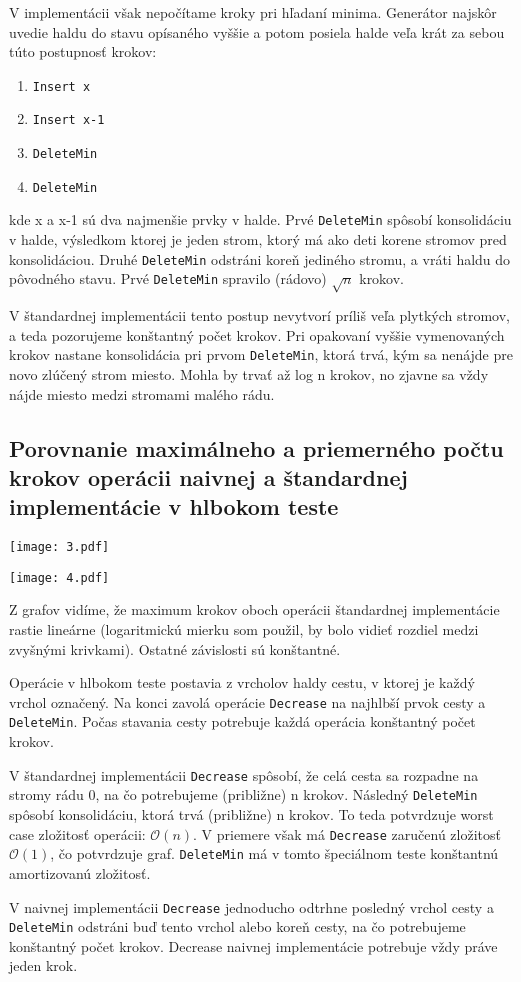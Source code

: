 \documentclass[12pt,a4paper]{article}
\begin{document}
V implementácii však nepočítame kroky pri hľadaní minima. Generátor najskôr uvedie haldu do stavu opísaného vyššie a potom posiela halde veľa krát za sebou túto postupnosť krokov:
\begin{enumerate}
	\item \texttt{Insert x}
	\item \texttt{Insert x-1}
	\item \texttt{DeleteMin}
	\item \texttt{DeleteMin}
\end{enumerate}
kde x a x-1 sú dva najmenšie prvky v halde. Prvé \texttt{DeleteMin} spôsobí konsolidáciu v halde, výsledkom ktorej je jeden strom, ktorý má ako deti korene stromov pred konsolidáciou. Druhé \texttt{DeleteMin} odstráni koreň jediného stromu, a vráti haldu do pôvodného stavu. Prvé \texttt{DeleteMin} spravilo (rádovo) $\sqrt{n}$ krokov.

V štandardnej implementácii tento postup nevytvorí príliš veľa plytkých stromov, a teda pozorujeme konštantný počet krokov. Pri opakovaní vyššie vymenovaných krokov nastane konsolidácia pri prvom \texttt{DeleteMin}, ktorá trvá, kým sa nenájde pre novo zlúčený strom miesto. Mohla by trvať až log n krokov, no zjavne sa vždy nájde miesto medzi stromami malého rádu.


\subsection{Porovnanie maximálneho a priemerného počtu krokov operácii naivnej a štandardnej implementácie v hlbokom teste}

\texttt{[image: 3.pdf]}

\texttt{[image: 4.pdf]}

Z grafov vidíme, že maximum krokov oboch operácii štandardnej implementácie rastie lineárne (logaritmickú mierku som použil, by bolo vidieť rozdiel medzi zvyšnými krivkami). Ostatné závislosti sú konštantné.

Operácie v hlbokom teste postavia z vrcholov haldy cestu, v ktorej je každý vrchol označený. Na konci zavolá operácie \texttt{Decrease} na najhlbší prvok cesty a \texttt{DeleteMin}. Počas stavania cesty potrebuje každá operácia konštantný počet krokov.

V štandardnej implementácii \texttt{Decrease} spôsobí, že celá cesta sa rozpadne na stromy rádu 0, na čo potrebujeme (približne) n krokov. Následný \texttt{DeleteMin} spôsobí konsolidáciu, ktorá trvá (približne) n krokov. To teda potvrdzuje worst case zložitosť operácii: $\mathcal{O}(n)$. V priemere však má \texttt{Decrease} zaručenú zložitosť $\mathcal{O}(1)$, čo potvrdzuje graf. \texttt{DeleteMin} má v tomto špeciálnom teste konštantnú amortizovanú zložitosť. 

V naivnej implementácii \texttt{Decrease} jednoducho odtrhne posledný vrchol cesty a \texttt{DeleteMin} odstráni buď tento vrchol alebo koreň cesty, na čo potrebujeme konštantný počet krokov. Decrease naivnej implementácie potrebuje vždy práve jeden krok. 
\end{document}
